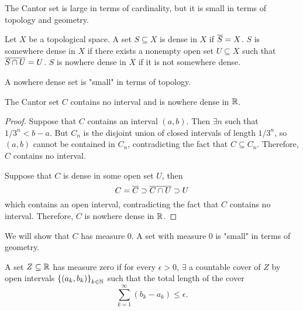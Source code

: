 The Cantor set is large in terms of cardinality, but it is small in terms of topology and geometry.

\begin{df}
    Let $X$ be a topological space. A set $S \subseteq X$ is dense in $X$ if $\Bar S = X$. $S$ is somewhere dense in $X$ if there exists a nonempty open set $U \subseteq X$ such that $\Bar{S \cap U} = U$. $S$ is nowhere dense in $X$ if it is not somewhere dense.
\end{df}

A nowhere dense set is "small" in terms of topology.

\begin{prop}
    The Cantor set $C$ contains no interval and is nowhere dense in $\R$.
    \begin{proof}
        Suppose that $C$ contains an interval $(a, b)$. Then $\exists n$ such that $1/3^n < b - a$. But $C_n$ is the disjoint union of closed intervals of length $1/3^n$, so $(a, b)$ cannot be contained in $C_n$, contradicting the fact that $C \subseteq C_n$. Therefore, $C$ contains no interval.

        Suppose that $C$ is dense in some open set $U$, then
        \[
        C = \Bar{C} \supset \Bar{C \cap U} \supset U
        \]
        which contains an open interval, contradicting the fact that $C$ contains no interval. Therefore, $C$ is nowhere dense in $\R$.
    \end{proof}
\end{prop}

We will show that $C$ has measure $0$. A set with measure $0$ is "small" in terms of geometry.

\begin{df}
    A set $Z \subseteq \R$ has measure zero if for every $\epsilon > 0$, $\exists$ a countable cover of $Z$ by open intervals $\set{(a_k, b_k)}_{k \in \N}$ such that the total length of the cover
    \[
    \sum_{k=1}^\infty (b_k - a_k) \leq \epsilon.
    \]
\end{df}

